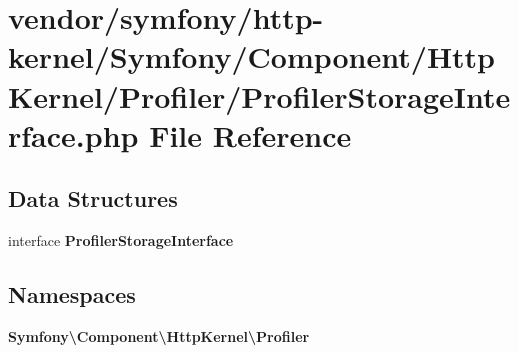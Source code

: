 \section{vendor/symfony/http-\/kernel/\+Symfony/\+Component/\+Http\+Kernel/\+Profiler/\+Profiler\+Storage\+Interface.php File Reference}
\label{_profiler_storage_interface_8php}
\subsection*{Data Structures}
\begin{DoxyCompactItemize}
\item 
interface {\bf Profiler\+Storage\+Interface}
\end{DoxyCompactItemize}
\subsection*{Namespaces}
\begin{DoxyCompactItemize}
\item 
 {\bf Symfony\textbackslash{}\+Component\textbackslash{}\+Http\+Kernel\textbackslash{}\+Profiler}
\end{DoxyCompactItemize}
